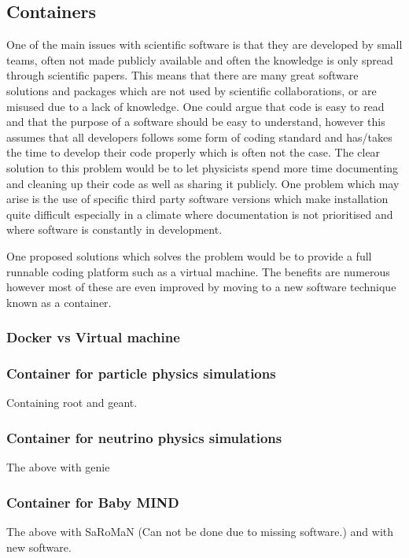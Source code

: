 \subsection{Containers}
One of the main issues with scientific software is that they are developed by small teams, often not made publicly available and often the knowledge is only spread through scientific papers. This means that there are many great software solutions and packages which are not used by scientific collaborations, or are misused due to a lack of knowledge. One could argue that code is easy to read and that the purpose of a software should be easy to understand, however this assumes that all developers follows some form of coding standard and has/takes the time to develop their code properly which is often not the case. The clear solution to this problem would be to let physicists spend more time documenting and cleaning up their code as well as sharing it publicly. One problem which may arise is the use of specific third party software versions which make installation quite difficult especially in a climate where documentation is not prioritised and where software is constantly in development.

One proposed solutions which solves the problem would be to provide a full runnable coding platform such as a virtual machine. The benefits are numerous however most of these are even improved by moving to a new software technique known as a container.

\subsubsection{Docker vs Virtual machine}

\subsubsection{Container for particle physics simulations}
Containing root and geant.

\subsubsection{Container for neutrino physics simulations}
The above with genie

\subsubsection{Container for Baby MIND}
The above with SaRoMaN (Can not be done due to missing software.) and with new software. 

